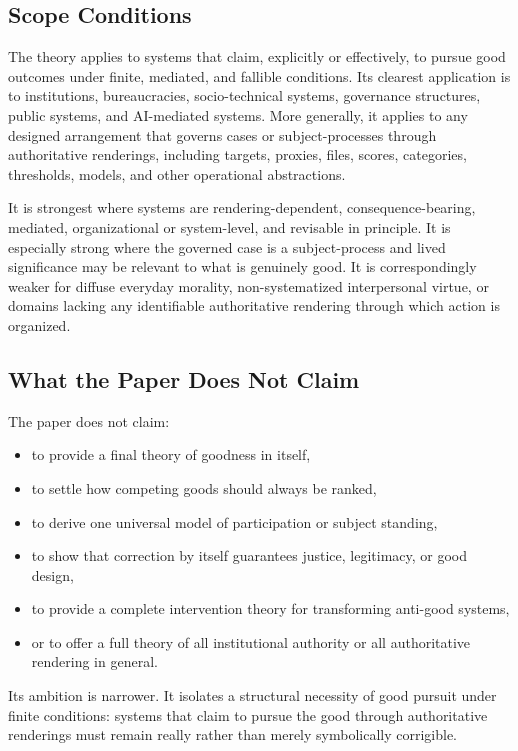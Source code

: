 \documentclass[11pt]{article}
\begin{document}
\subsection{Scope Conditions}

The theory applies to systems that claim, explicitly or effectively, to pursue good outcomes under finite, mediated, and fallible conditions. Its clearest application is to institutions, bureaucracies, socio-technical systems, governance structures, public systems, and AI-mediated systems. More generally, it applies to any designed arrangement that governs cases or subject-processes through authoritative renderings, including targets, proxies, files, scores, categories, thresholds, models, and other operational abstractions.

It is strongest where systems are rendering-dependent, consequence-bearing, mediated, organizational or system-level, and revisable in principle. It is especially strong where the governed case is a subject-process and lived significance may be relevant to what is genuinely good. It is correspondingly weaker for diffuse everyday morality, non-systematized interpersonal virtue, or domains lacking any identifiable authoritative rendering through which action is organized.

\subsection{What the Paper Does Not Claim}

The paper does not claim:
\begin{itemize}
    \item to provide a final theory of goodness in itself,
    \item to settle how competing goods should always be ranked,
    \item to derive one universal model of participation or subject standing,
    \item to show that correction by itself guarantees justice, legitimacy, or good design,
    \item to provide a complete intervention theory for transforming anti-good systems,
    \item or to offer a full theory of all institutional authority or all authoritative rendering in general.
\end{itemize}

Its ambition is narrower. It isolates a structural necessity of good pursuit under finite conditions: systems that claim to pursue the good through authoritative renderings must remain really rather than merely symbolically corrigible.
\end{document}
